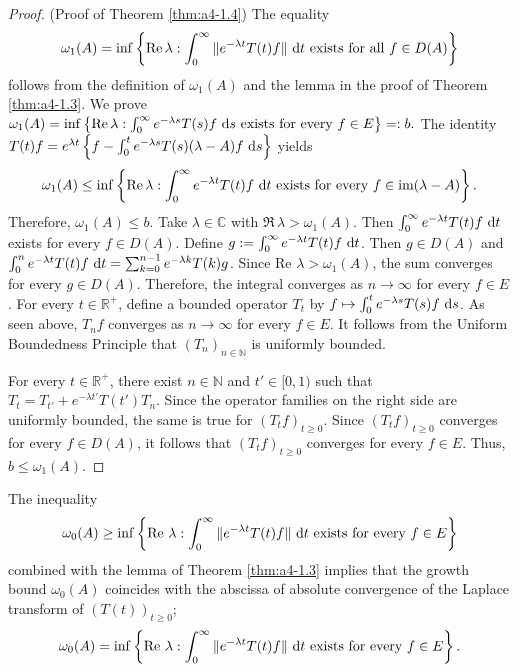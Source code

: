\begin{proof}(Proof of Theorem \ref{thm:a4-1.4}) 
The equality 
 \[ 
 \omega_1(A) = \inf \left\{ \mathop{}\!\mathrm{Re}\,\lambda : \int_0^\infty \|e^{-\lambda t} T(t) f \| \,\mathop{}\!\mathrm{d}{t} \text{ exists for all } f \in D(A) \right\} 
 \] 
 follows from the definition of $\omega_1(A)$ and the lemma in the proof of Theorem \ref{thm:a4-1.3}.
We prove 
$
\omega_1(A) = \inf \left\{ \mathop{}\!\mathrm{Re}\,\lambda : \int_0^\infty e^{-\lambda s} T(s) f \,\mathop{}\!\mathrm{d}{s} \text{ exists for every } f \in E \right\}=: b. 
$
The identity
$    T(t) f = e^{\lambda t} \left\{ f - \int_0^t e^{-\lambda s} T(s) (\lambda - A) f \,\mathop{}\!\mathrm{d}{s} \right\}
$
yields
\[
\omega_1(A) \leq \inf \left\{ \mathop{}\!\mathrm{Re}\,\lambda : \int_0^\infty e^{-\lambda t} T(t) f \,\mathop{}\!\mathrm{d}{t} \text{ exists for every } f \in \text{im} (\lambda - A) \right\}.
\]
Therefore,
$\omega_1(A) \leq b.
$
Take $\lambda \in \mathbb{C}$ with $\Re\,\lambda > \omega_1(A)$. 
Then $\int_0^\infty e^{-\lambda t} T(t) f \,\mathop{}\!\mathrm{d}{t}$ exists for every $f \in D(A)$. 
Define $g := \int_0^\infty e^{-\lambda t} T(t) f \,\mathop{}\!\mathrm{d}{t}$. 
Then $g \in D(A)$ and $\int_0^n e^{-\lambda t} T(t) f \,\mathop{}\!\mathrm{d}{t} = \sum_{k=0}^{n-1} e^{-\lambda k} T(k) g$. 
Since $\text{Re } \lambda > \omega_1(A)$, the sum converges for every $g \in D(A)$. 
Therefore, the integral converges as $n \to \infty$ for every $f \in E$.
For every $t \in \mathbb{R}^+$, define a bounded operator $T_t$ by $ f \mapsto \int_0^t e^{-\lambda s} T(s) f \,\mathop{}\!\mathrm{d}{s}$. 
As seen above, $T_n f$ converges as $n \to \infty$ for every $f \in E$. 
It follows from the Uniform Boundedness Principle that $(T_n)_{n \in \mathbb{N}}$ is uniformly bounded.


For every $t \in \mathbb{R}^+$, there exist $n \in \mathbb{N}$ and $t' \in [0,1)$ such that $T_t = T_{t'} + e^{-\lambda t'} T(t') T_n$. 
Since the operator families on the right side are uniformly bounded, the same is true for $(T_t f)_{t \geq 0}$. 
Since $(T_t f)_{t \geq 0}$ converges for every $f \in D(A)$, it follows that $(T_t f)_{t \geq 0}$ converges for every $f \in E$. 
Thus, $b \leq \omega_1(A)$.
\end{proof}



The inequality
\[
    \omega_0(A) \geq \inf \left\{ \text{Re } \lambda : \int_0^\infty \|e^{-\lambda t} T(t) f \| \,\mathop{}\!\mathrm{d}{t} 
    \text{ exists for every } f \in E \right\}
\]
combined with the lemma of Theorem \ref{thm:a4-1.3} implies that the growth bound $\omega_0(A)$ coincides with the abscissa of absolute convergence of the Laplace transform of $(T(t))_{t \geq 0}$; \ie
\begin{equation}\label{eq:a4-1.6}
   \omega_0(A) = \inf \left\{ \text{Re } \lambda : \int_0^\infty \|e^{-\lambda t} T(t) f \| \,\mathop{}\!\mathrm{d}{t} \text{ exists for every } f \in E \right\}.
\end{equation}


